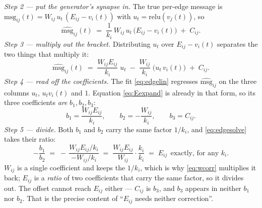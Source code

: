 \documentclass[11pt,a4paper]{article}
\newcommand{\vj}{v_j}
\newcommand{\vi}{v_i}
\newcommand{\Wij}{W_{ij}}
\newcommand{\Eij}{E_{ij}}
\newcommand{\msg}{\mathrm{msg}}
\newcommand{\act}{\mathrm{relu}}
\begin{document}
\emph{Step 2 --- put the generator's synapse in.} The true per-edge message is
$\msg_{ij}(t) = \Wij\,u_t\,(\Eij - \vi(t))$ with $u_t = \act(\vj(t))$, so
%
\begin{equation}
\widehat{\msg}_{ij}(t)
  \;=\; \frac{1}{k_i}\,\Wij\,u_t\,\bigl(\Eij - \vi(t)\bigr) \;+\; C_{ij}.
\end{equation}
%
\emph{Step 3 --- multiply out the bracket.} Distributing $u_t$ over
$\Eij - \vi(t)$ separates the two things that multiply it:
%
\begin{equation}
\widehat{\msg}_{ij}(t)
  \;=\; \frac{\Wij \Eij}{k_i}\;u_t
  \;-\; \frac{\Wij}{k_i}\;\bigl(u_t\,\vi(t)\bigr)
  \;+\; C_{ij}.
\label{eq:Eexpand}
\end{equation}
%
\emph{Step 4 --- read off the coefficients.} The fit \eqref{eq:edgelin} regresses
$\widehat{\msg}_{ij}$ on the three columns $u_t$, $u_t \vi(t)$ and $1$. Equation
\eqref{eq:Eexpand} is already in that form, so its three coefficients \emph{are}
$b_1, b_2, b_3$:
%
\begin{equation}
b_1 = \frac{\Wij \Eij}{k_i}, \qquad
b_2 = -\frac{\Wij}{k_i}, \qquad
b_3 = C_{ij}.
\label{eq:Ecoeffs}
\end{equation}
%
\emph{Step 5 --- divide.} Both $b_1$ and $b_2$ carry the same factor $1/k_i$,
and \eqref{eq:edgesolve} takes their ratio:
%
\begin{equation}
-\frac{b_1}{b_2}
  \;=\; -\,\frac{\Wij \Eij / k_i}{-\Wij / k_i}
  \;=\; \frac{\Wij \Eij}{\Wij}\cdot\frac{k_i}{k_i}
  \;=\; \Eij \ \ \text{exactly, for any } k_i .
\end{equation}
%
$\Wij$ is a single coefficient and keeps the $1/k_i$, which is why
\eqref{eq:wcorr} multiplies it back; $\Eij$ is a \emph{ratio} of two coefficients
that carry the same factor, so it divides out. The offset cannot reach $\Eij$
either --- $C_{ij}$ is $b_3$, and $b_3$ appears in neither $b_1$ nor $b_2$. That
is the precise content of ``$\Eij$ needs neither correction''.
\end{document}
